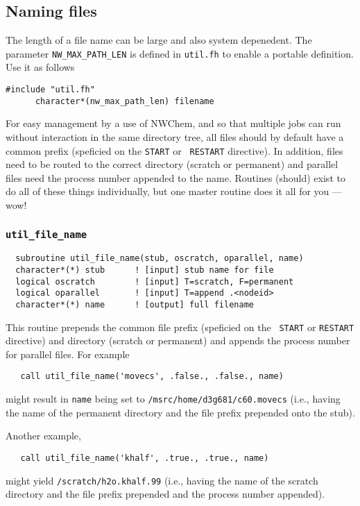 \subsection{Naming files}

The length of a file name can be large and also system depenedent.
The parameter \verb+NW_MAX_PATH_LEN+ is defined in \verb+util.fh+ to
enable a portable definition.  Use it as follows
\begin{verbatim}
#include "util.fh"
      character*(nw_max_path_len) filename
\end{verbatim}

For easy management by a use of NWChem, and so that multiple jobs can
run without interaction in the same directory tree, all files should
by default have a common prefix (speficied on the {\tt START} or {\tt
  RESTART} directive).  In addition, files need to be routed to the
correct directory (scratch or permanent) and parallel files need the
process number appended to the name.  Routines (should) exist to do
all of these things individually, but one master routine does it all
for you --- wow!

\subsubsection{{\tt util\_file\_name}}

\begin{verbatim}
  subroutine util_file_name(stub, oscratch, oparallel, name)
  character*(*) stub      ! [input] stub name for file
  logical oscratch        ! [input] T=scratch, F=permanent
  logical oparallel       ! [input] T=append .<nodeid>
  character*(*) name      ! [output] full filename
\end{verbatim}

This routine prepends the common file prefix (speficied on the {\tt
  START} or {\tt RESTART} directive) and directory (scratch or
permanent) and appends the process number for parallel files. For
example
\begin{verbatim}
   call util_file_name('movecs', .false., .false., name)
\end{verbatim}
might result in \verb+name+ being set to
\verb+/msrc/home/d3g681/c60.movecs+ (i.e., having the name of the
permanent directory and the file prefix prepended onto the stub).

Another example,
\begin{verbatim}
   call util_file_name('khalf', .true., .true., name)
\end{verbatim}
might yield \verb+/scratch/h2o.khalf.99+ (i.e., having the name
of the scratch directory and the file prefix prepended and the process
number appended).

